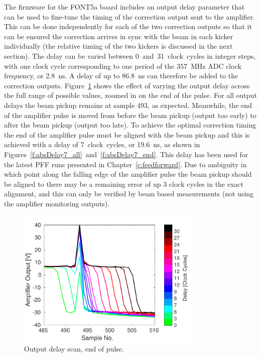 The firmware for the FONT5a board includes an output delay parameter that can be used to fine-tune the timing of the correction output sent to the amplifier. This can be done independently for each of the two correction outputs so that it can be ensured the correction arrives in sync with the beam in each kicker individually (the relative timing of the two kickers is discussed in the next section). The delay can be varied between 0~and~31~clock~cycles in integer steps, with one clock cycle corresponding to one period of the 357~MHz ADC clock frequency, or 2.8~ns. A delay of up to 86.8~ns can therefore be added to the correction outputs. Figure~\ref{f:absDelayAll_endPulse} shows the effect of varying the output delay across the full range of possible values, zoomed in on the end of the pulse. For all output delays the beam pickup remains at sample 493, as expected. Meanwhile, the end of the amplifier pulse is moved from before the beam pickup (output too early) to after the beam pickup (output too late). To achieve the optimal correction timing the end of the amplifier pulse must be aligned with the beam pickup and this is achieved with a delay of 7~clock~cycles, or 19.6~ns, as shown in Figures~\ref{f:absDelay7_all}~and~\ref{f:absDelay7_end}. This delay has been used for the latest PFF runs presented in Chapter~\ref{c:feedforward}. Due to ambiguity in which point along the falling edge of the amplifier pulse the beam pickup should be aligned to there may be a remaining error of up 3 clock cycles in the exact alignment, and this can only be verified by beam based measurements (not using the amplifier monitoring outputs). 

\begin{figure}
  \centering
  \includegraphics[width=0.8\textwidth]{Figures/commissioning/absDelayAll_endPulse}
  \caption{Output delay scan, end of pulse.}
  \label{f:absDelayAll_endPulse}
\end{figure}

